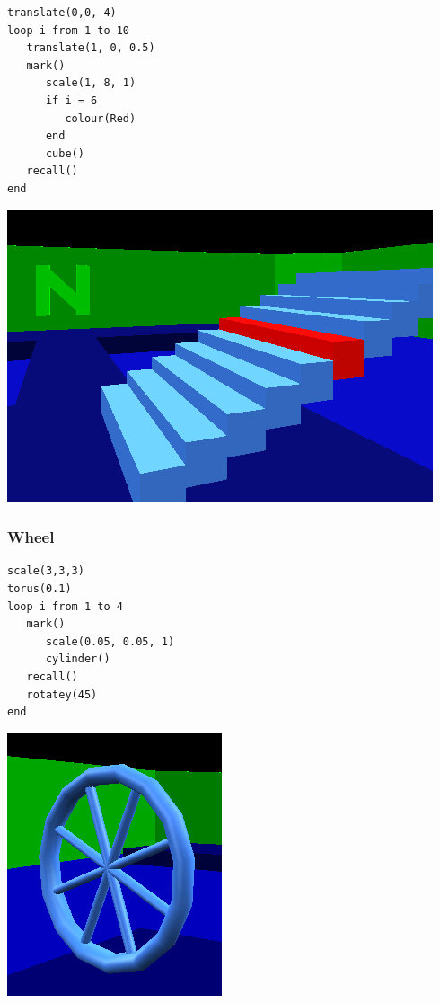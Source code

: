 \documentclass[12pt,a4paper,twoside]{article}
\renewcommand{\_}{\texttt{\symbol{95}}}
\begin{document}
\begin{minipage}{8cm}
\begin{verbatim}
translate(0,0,-4)
loop i from 1 to 10
   translate(1, 0, 0.5)
   mark()
      scale(1, 8, 1)
      if i = 6
         colour(Red)
      end
      cube()
   recall()
end
\end{verbatim}
\end{minipage}
\begin{minipage}{8cm}
	\begin{center}
	\includegraphics[scale=0.5,angle=0]{screenshots/3d/steps}
	\end{center}
\end{minipage}

\subsubsection*{Wheel}

\begin{minipage}{8cm}
\begin{verbatim}
scale(3,3,3)
torus(0.1)
loop i from 1 to 4
   mark()
      scale(0.05, 0.05, 1)
      cylinder()
   recall()
   rotatey(45)
end
\end{verbatim}
\end{minipage}
\begin{minipage}{8cm}
	\begin{center}
	\includegraphics[scale=0.6,angle=0]{screenshots/3d/wheel}
	\end{center}
\end{minipage}
\end{document}
